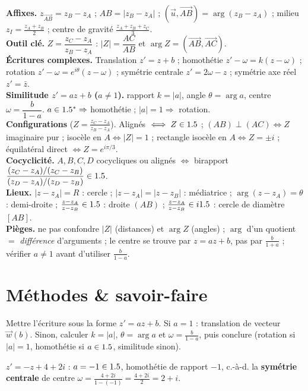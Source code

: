 \begin{synthese}
\textbf{Affixes.} $z_{\overrightarrow{AB}}=z_B-z_A$ ; $AB=|z_B-z_A|$ ;
$(\vec u,\overrightarrow{AB})=\arg(z_B-z_A)$ ; milieu $z_I=\frac{z_A+z_B}2$ ;
centre de gravité $\frac{z_A+z_B+z_C}3$.\\[4pt]
\textbf{Outil clé.} $Z=\dfrac{z_C-z_A}{z_B-z_A}$ : $|Z|=\dfrac{AC}{AB}$ et
$\arg Z=(\overrightarrow{AB},\overrightarrow{AC})$.\\[4pt]
\textbf{Écritures complexes.} Translation $z'=z+b$ ; homothétie $z'-\omega=k(z-\omega)$ ;
rotation $z'-\omega=e^{i\theta}(z-\omega)$ ; symétrie centrale $z'=2\omega-z$ ;
symétrie axe réel $z'=\bar z$.\\[4pt]
\textbf{Similitude $z'=az+b$ ($a\neq1$).} rapport $k=|a|$, angle $\theta=\arg a$,
centre $\omega=\dfrac b{1-a}$. $a\in1.5^*\Rightarrow$ homothétie ; $|a|=1\Rightarrow$ rotation.\\[4pt]
\textbf{Configurations} ($Z=\frac{z_C-z_A}{z_B-z_A}$). Alignés $\iff Z\in1.5$ ;
$(AB)\perp(AC)\iff Z$ imaginaire pur ; isocèle en $A\iff|Z|=1$ ; rectangle isocèle en
$A\iff Z=\pm i$ ; équilatéral direct $\iff Z=e^{i\pi/3}$.\\[4pt]
\textbf{Cocyclicité.} $A,B,C,D$ cocycliques ou alignés $\iff$ birapport
$\dfrac{(z_C-z_A)/(z_C-z_B)}{(z_D-z_A)/(z_D-z_B)}\in1.5$.\\[4pt]
\textbf{Lieux.} $|z-z_A|=R$ : cercle ; $|z-z_A|=|z-z_B|$ : médiatrice ;
$\arg(z-z_A)=\theta$ : demi-droite ; $\frac{z-z_A}{z-z_B}\in1.5$ : droite $(AB)$ ;
$\frac{z-z_A}{z-z_B}\in i1.5$ : cercle de diamètre $[AB]$.\\[4pt]
\textbf{Pièges.} ne pas confondre $|Z|$ (distances) et $\arg Z$ (angles) ;
$\arg$ d'un quotient $=$ \emph{différence} d'arguments ; le centre se trouve par
$z=az+b$, pas par $\frac{b}{1+a}$ ; vérifier $a\neq1$ avant d'utiliser $\frac b{1-a}$.
\end{synthese}

\section{Méthodes \& savoir-faire}

Mettre l'écriture sous la forme $z'=az+b$. Si $a=1$ : translation de vecteur $\vec w(b)$. Sinon,
calculer $k=|a|$, $\theta=\arg a$ et $\omega=\frac b{1-a}$, puis conclure (rotation si $|a|=1$,
homothétie si $a\in1.5$, similitude sinon).
\begin{exemple}
$z'=-z+4+2i$ : $a=-1\in1.5$, homothétie de rapport $-1$, c.-à-d. la \textbf{symétrie centrale} de
centre $\omega=\frac{4+2i}{1-(-1)}=\frac{4+2i}2=2+i$.
\end{exemple}

